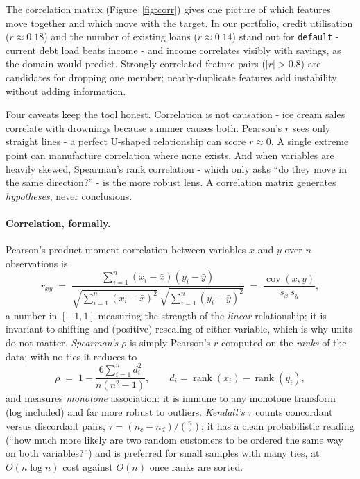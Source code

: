 \documentclass[11pt,a4paper]{article}
\begin{document}
The correlation matrix (Figure~\ref{fig:corr}) gives one picture of which
features move together and which move with the target. In our portfolio,
credit utilisation ($r \approx 0.18$) and the number of existing loans
($r \approx 0.14$) stand out for \texttt{default} - current debt load
beats income - and income correlates visibly with savings, as the domain
would predict. Strongly correlated feature pairs ($|r| > 0.8$) are
candidates for dropping one member; nearly-duplicate features add
instability without adding information.

Four caveats keep the tool honest. Correlation is not causation - ice
cream sales correlate with drownings because summer causes both. Pearson's
$r$ sees only straight lines - a perfect U-shaped relationship can score
$r \approx 0$. A single extreme point can manufacture correlation where none
exists. And when variables are heavily skewed, Spearman's rank correlation
- which only asks ``do they move in the same direction?'' - is the more
robust lens. A correlation matrix generates \emph{hypotheses}, never
conclusions.

\paragraph{Correlation, formally.} Pearson's product-moment correlation
between variables $x$ and $y$ over $n$ observations is
\[
r_{xy} \;=\; \frac{\sum_{i=1}^{n}(x_i-\bar{x})(y_i-\bar{y})}
{\sqrt{\sum_{i=1}^{n}(x_i-\bar{x})^2}\,\sqrt{\sum_{i=1}^{n}(y_i-\bar{y})^2}}
\;=\; \frac{\operatorname{cov}(x,y)}{s_x\, s_y},
\]
a number in $[-1,1]$ measuring the strength of the \emph{linear}
relationship; it is invariant to shifting and (positive) rescaling of either
variable, which is why units do not matter. \emph{Spearman's} $\rho$ is
simply Pearson's $r$ computed on the \emph{ranks} of the data; with no ties
it reduces to
\[
\rho \;=\; 1 - \frac{6\sum_{i=1}^{n} d_i^{2}}{n(n^{2}-1)},
\qquad d_i = \operatorname{rank}(x_i) - \operatorname{rank}(y_i),
\]
and measures \emph{monotone} association: it is immune to any monotone
transform (log included) and far more robust to outliers. \emph{Kendall's}
$\tau$ counts concordant versus discordant pairs,
$\tau = (n_c - n_d)/\binom{n}{2}$; it has a clean probabilistic reading
(``how much more likely are two random customers to be ordered the same way
on both variables?'') and is preferred for small samples with many ties,
at $O(n \log n)$ cost against $O(n)$ once ranks are sorted.
\end{document}
